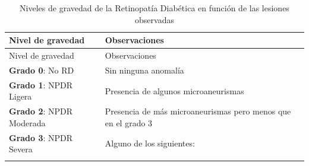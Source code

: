\documentclass[
  12pt,
  spanish,
  a4paperpaper,
]{report}
\begin{document}
\begin{longtable}[]{@{}ll@{}}
\caption{Niveles de gravedad de la Retinopatía Diabética en función de
las lesiones observadas \label{estadios_lesiones}}\tabularnewline
\toprule
\begin{minipage}[b]{0.37\columnwidth}\raggedright
Nivel de gravedad\strut
\end{minipage} & \begin{minipage}[b]{0.57\columnwidth}\raggedright
Observaciones\strut
\end{minipage}\tabularnewline
\midrule
\endfirsthead
\toprule
\begin{minipage}[b]{0.37\columnwidth}\raggedright
Nivel de gravedad\strut
\end{minipage} & \begin{minipage}[b]{0.57\columnwidth}\raggedright
Observaciones\strut
\end{minipage}\tabularnewline
\midrule
\endhead
\begin{minipage}[t]{0.37\columnwidth}\raggedright
\textbf{Grado 0}: No RD\strut
\end{minipage} & \begin{minipage}[t]{0.57\columnwidth}\raggedright
Sin ninguna anomalía\strut
\end{minipage}\tabularnewline
\begin{minipage}[t]{0.37\columnwidth}\raggedright
\textbf{Grado 1}: NPDR Ligera\strut
\end{minipage} & \begin{minipage}[t]{0.57\columnwidth}\raggedright
Presencia de algunos microaneurismas\strut
\end{minipage}\tabularnewline
\begin{minipage}[t]{0.37\columnwidth}\raggedright
\textbf{Grado 2}: NPDR Moderada\strut
\end{minipage} & \begin{minipage}[t]{0.57\columnwidth}\raggedright
Presencia de más microaneurismas pero menos que en el grado 3\strut
\end{minipage}\tabularnewline
\begin{minipage}[t]{0.37\columnwidth}\raggedright
\textbf{Grado 3}: NPDR Severa\strut
\end{minipage} & \begin{minipage}[t]{0.57\columnwidth}\raggedright
Alguno de los siguientes:\strut
\end{minipage}\tabularnewline
\begin{minipage}[t]{0.37\columnwidth}\raggedright
\strut

\end{minipage}
\end{longtable}
\end{document}

